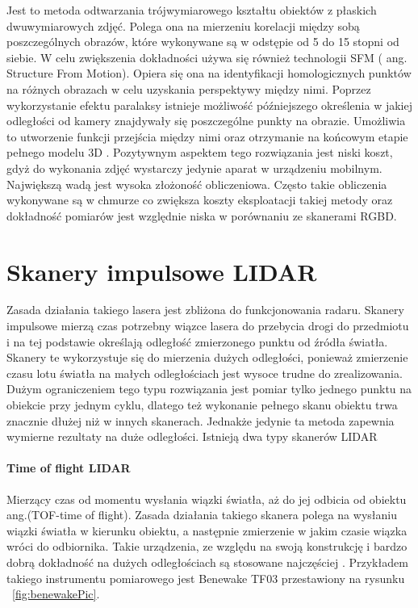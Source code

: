 \documentclass{pginz}
\begin{document}
Jest to metoda odtwarzania trójwymiarowego kształtu obiektów z płaskich dwuwymiarowych zdjęć. Polega ona na mierzeniu korelacji między sobą poszczególnych obrazów, które wykonywane są w odstępie od 5 do 15 stopni od siebie. W celu zwiększenia dokładności używa się również technologii SFM ( ang. Structure From Motion). Opiera się ona na identyfikacji homologicznych punktów na różnych obrazach w celu uzyskania perspektywy między nimi. Poprzez wykorzystanie efektu paralaksy istnieje możliwość późniejszego określenia w jakiej odległości od kamery znajdywały się poszczególne punkty na obrazie. Umożliwia to utworzenie funkcji przejścia między nimi oraz otrzymanie na końcowym etapie pełnego modelu 3D \cite{glowienka2015fotogrametria}. Pozytywnym aspektem tego rozwiązania jest niski koszt, gdyż do wykonania zdjęć wystarczy jedynie aparat w urządzeniu mobilnym. Największą wadą jest wysoka złożoność obliczeniowa. Często takie obliczenia wykonywane są w chmurze co zwiększa koszty eksploatacji takiej metody oraz dokładność pomiarów jest względnie niska w porównaniu ze skanerami RGBD.

\section{Skanery impulsowe LIDAR}

Zasada działania takiego lasera jest zbliżona do funkcjonowania radaru. Skanery impulsowe mierzą czas potrzebny wiązce lasera do przebycia drogi do przedmiotu i na tej podstawie określają odległość zmierzonego punktu od  źródła światła. Skanery te wykorzystuje się do mierzenia dużych odległości, ponieważ zmierzenie czasu lotu światła na małych odległościach jest wysoce trudne do zrealizowania. Dużym ograniczeniem tego typu rozwiązania jest pomiar tylko jednego punktu na obiekcie przy jednym cyklu, dlatego też wykonanie pełnego skanu obiektu trwa znacznie dłużej niż w innych skanerach. Jednakże jedynie ta metoda zapewnia wymierne rezultaty na duże odległości.
\newline
Istnieją dwa typy skanerów LIDAR \cite{wehr1999airborne}
\paragraph{Time of flight LIDAR\newline}
Mierzący czas od momentu wysłania wiązki światła, aż do jej odbicia od obiektu ang.(TOF-time of flight). Zasada działania takiego skanera polega na wysłaniu wiązki światła w kierunku obiektu, a następnie zmierzenie w jakim czasie wiązka wróci do odbiornika. Takie urządzenia, ze względu na swoją konstrukcję i bardzo dobrą dokładność na dużych odległościach są stosowane najczęściej \cite{introToLidar}.
Przykładem takiego instrumentu pomiarowego jest Benewake TF03 przestawiony na rysunku  ~\ref{fig:benewakePic}.
\end{document}
